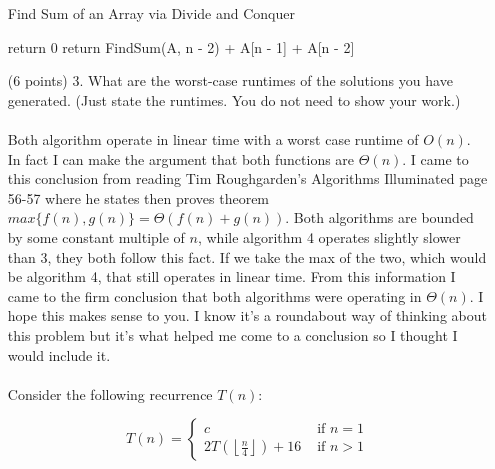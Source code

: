 \documentclass[paper=a4,fontsize=11pt]{article}
\begin{document}
\begin{enumerate}
{\begin{algorithm}
\caption{Find Sum of an Array via Divide and Conquer}
\label{array-sum}
\begin{algorithmic}[1]
        \State return 0
    \Else
        \State return FindSum(A, n - 2) + A[n - 1] + A[n - 2] 
    \EndIf
\EndProcedure
\end{algorithmic}
\end{algorithm}
}
\item [(6 points) 3.] What are the worst-case runtimes of the solutions you have generated. (Just state the runtimes. You do not need to show your work.)\\\\
Both algorithm operate in linear time with a worst case runtime of $O(n)$. In fact I can make the argument that both functions are $\Theta(n)$. I came to this conclusion from reading Tim Roughgarden's Algorithms Illuminated page 56-57 where he states then proves theorem $max\{f(n),g(n)\} = \Theta(f(n) + g(n))$. Both algorithms are bounded by some constant multiple of $n$, while algorithm 4 operates slightly slower than 3, they both follow this fact. If we take the max of the two, which would be algorithm 4, that still operates in linear time. From this information I came to the firm conclusion that both algorithms were operating in $\Theta(n)$. I hope this makes sense to you. I know it's a roundabout way of thinking about this problem but it's what helped me come to a conclusion so I thought I would include it.\\\\
Consider the following recurrence $T(n)$:

\[
T(n) = \left\{
\begin{array}{cl}
c & \textrm{ if } n = 1\\
2T(\left\lfloor\frac{n}{4}\right\rfloor) + 16 & \textrm{ if } n > 1
\end{array}
\right.
\]


\end{enumerate}
\end{document}
